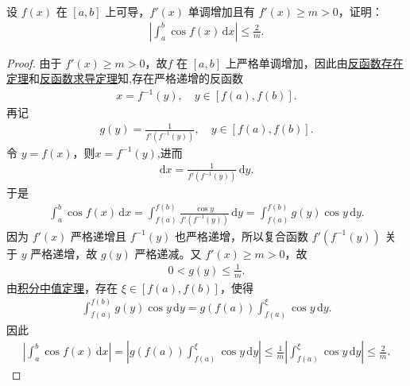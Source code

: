 \documentclass[../../main.tex]{subfiles}%
\begin{document}
\begin{example}
设 $f(x)$ 在 $[a,b]$ 上可导，$f'(x)$ 单调增加且有 $f'(x)\geqslant m>0$，证明：
\begin{align*}
\left|\int_a^b \cos f(x)\,\mathrm{d}x\right|\leqslant \frac{2}{m}.
\end{align*}
\end{example}
\begin{proof}

由于 $f'(x)\geqslant m>0$，故$f$ 在 $[a,b]$ 上严格单调增加，因此由\hyperref[theorem:反函数存在定理]{反函数存在定理}和\hyperref[theorem:反函数求导定理]{反函数求导定理}知,存在严格递增的反函数
\begin{align*}
x=f^{-1}(y),\quad y\in[f(a),f(b)].
\end{align*}
再记
\begin{align*}
g(y)=\frac{1}{f'(f^{-1}(y))},\quad y\in[f(a),f(b)].
\end{align*}
令 $y=f(x)$，则$x=f^{-1}(y)$,进而
\begin{align*}
\mathrm{d}x = \frac{1}{f'(f^{-1}(y))}\,\mathrm{d}y.
\end{align*}
于是
\begin{align*}
\int_a^b{\cos f\left( x \right) \,\mathrm{d}x}=\int_{f\left( a \right)}^{f\left( b \right)}{\frac{\cos y}{f' \left( f^{-1}\left( y \right) \right)}\,\mathrm{d}y}=\int_{f\left( a \right)}^{f\left( b \right)}{g\left( y \right) \cos y\,\mathrm{d}y}.
\end{align*}
因为 $f'(x)$ 严格递增且 $f^{-1}(y)$ 也严格递增，所以复合函数 $f'(f^{-1}(y))$ 关于 $y$ 严格递增，故 $g(y)$ 严格递减。又 $f'(x)\geqslant m>0$，故
\begin{align*}
0<g(y)\leqslant \frac{1}{m}.
\end{align*}
由\hyperref[theorem:积分中值定理]{积分中值定理}，存在 $\xi\in[f(a),f(b)]$，使得
\begin{align*}
\int_{f(a)}^{f(b)} g(y)\cos y\,\mathrm{d}y = g(f(a)) \int_{f(a)}^{\xi} \cos y\,\mathrm{d}y.
\end{align*}
因此
\begin{align*}
\left| \int_a^b{\cos f(x)\,\mathrm{d}x} \right|=\left| g(f(a))\int_{f(a)}^{\xi}{\cos y\,\mathrm{d}y} \right|\leqslant \frac{1}{m}\left| \int_{f(a)}^{\xi}{\cos y\,\mathrm{d}y} \right|\leqslant \frac{2}{m}.
\end{align*}
\end{proof}
\end{document}
